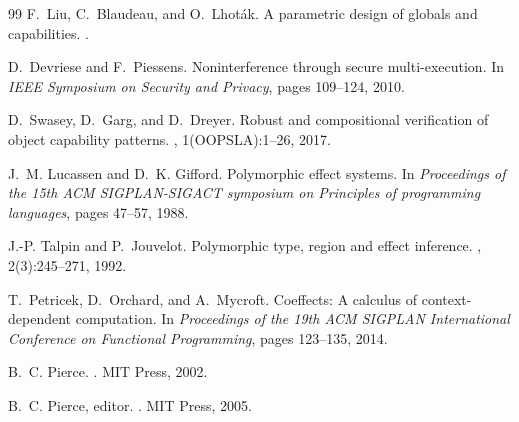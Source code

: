 \documentclass[11pt,a4paper]{article}
\begin{document}
\begin{thebibliography}{99}
F.~Liu, C.~Blaudeau, and O.~Lhot\'ak. %
\newblock A parametric design of globals and capabilities. %
. %

D.~Devriese and F.~Piessens. %
\newblock Noninterference through secure multi-execution. %
\newblock In {\em IEEE Symposium on Security and Privacy}, pages 109--124, 2010. %

D.~Swasey, D.~Garg, and D.~Dreyer. %
\newblock Robust and compositional verification of object capability patterns. %
, 1(OOPSLA):1--26,
  2017. %

J.~M. Lucassen and D.~K. Gifford. %
\newblock Polymorphic effect systems. %
\newblock In {\em Proceedings of the 15th ACM SIGPLAN-SIGACT symposium on
  Principles of programming languages}, pages 47--57, 1988. %

J.-P. Talpin and P.~Jouvelot. %
\newblock Polymorphic type, region and effect inference. %
, 2(3):245--271, 1992. %

T.~Petricek, D.~Orchard, and A.~Mycroft. %
\newblock Coeffects: A calculus of context-dependent computation. %
\newblock In {\em Proceedings of the 19th ACM SIGPLAN International Conference
  on Functional Programming}, pages 123--135, 2014. %

B.~C. Pierce. %
. %
\newblock MIT Press, 2002. %

B.~C. Pierce, editor. %
. %
\newblock MIT Press, 2005. %

\end{thebibliography}
\end{document}
